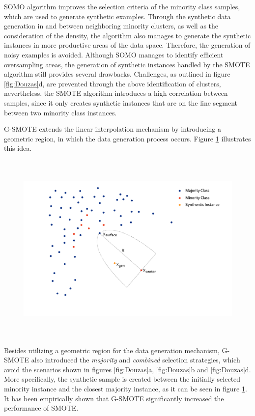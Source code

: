 \documentclass[parskip=full]{scrartcl}
\begin{document}
SOMO algorithm improves the selection criteria of the minority class samples, which are used to generate synthetic examples. Through the synthetic data generation in and between neighboring minority clusters, as well as the consideration of the density, the algorithm also manages to generate the synthetic instances in more productive areas of the data space. Therefore, the generation of noisy examples is avoided. Although SOMO manages to identify efficient oversampling areas, the generation of synthetic instances handled by the SMOTE algorithm still provides several drawbacks. Challenges, as outlined in figure \ref{fig:Douzas}d, are prevented through the above identification of clusters, nevertheless, the SMOTE algorithm introduces a high correlation between samples, since it only creates synthetic instances that are on the line segment between two minority class instances.

G-SMOTE extends the linear interpolation mechanism by introducing a geometric region, in which the data generation process occurs. Figure \ref{fig:GSMOTE} illustrates this idea.

\begin{figure}[H]
	\centering
	\includegraphics[width=12cm, height=9.5cm, keepaspectratio]{../analysis/fig4.png}
	\label{fig:GSMOTE}
\end{figure}

Besides utilizing a geometric region for the data generation mechanism, G-SMOTE also introduced the \textit{majority} and \textit{combined} selection strategies, which avoid the scenarios shown in figures \ref{fig:Douzas}a, \ref{fig:Douzas}b and \ref{fig:Douzas}d. More specifically, the synthetic sample is created between the initially selected minority instance and the closest majority instance, as it can be seen in figure \ref{fig:GSMOTE}. It has been empirically shown that G-SMOTE \cite{Douzas2019} significantly increased the performance of SMOTE.
\end{document}
